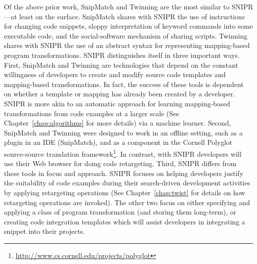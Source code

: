 Of the above prior work, SnipMatch and Twinning are the most similar to \uppercase{SnipR}---at least on the surface. SnipMatch shares with \uppercase{SnipR} the use of instructions for changing code snippets, sloppy interpretation of keyword commands into some executable code, and the social-software mechanism of sharing scripts. Twinning shares with \uppercase{SnipR} the use of an abstract syntax for representing mapping-based program transformations. \uppercase{SnipR} distinguishes itself in three important ways. First, SnipMatch and Twinning are technologies that depend on the constant willingness of developers to create and modify source code templates and mapping-based transformations. In fact, the success of these tools is dependent on whether a template or mapping has already been created by a developer. \uppercase{SnipR} is more akin to an automatic approach for learning mapping-based transformations from code examples at a larger scale (See Chapter~\ref{chap:algorithms} for more details) via a machine learner. Second, SnipMatch and Twinning were designed to work in an offline setting, such as a plugin in an IDE (SnipMatch), and as a component in the Cornell Polyglot source-source translation framework\footnote{\url{http://www.cs.cornell.edu/projects/polyglot}}. In contrast, with \uppercase{SnipR} developers will use their Web browser for doing code retargeting. Third, \uppercase{SnipR} differs from these tools in focus and approach. \uppercase{SnipR} focuses on helping developers justify the suitability of code examples during their search-driven development activities by applying retargeting operations (See Chapter~\ref{chap:twist} for details on how retargeting operations are invoked). The other two focus on either specifying and applying a class of program transformation (and storing them long-term), or creating code integration templates which will assist developers in integrating a snippet into their projects.  
